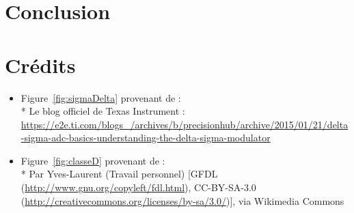 \documentclass[10pt, oneside, a4paper]{article}
\begin{document}
\section*{Conclusion}


\section*{Crédits}
\begin{itemize}

\item Figure~\ref{fig:sigmaDelta} provenant de :\\*
Le blog officiel de Texas Instrument :
\url{https://e2e.ti.com/blogs_/archives/b/precisionhub/archive/2015/01/21/delta-sigma-adc-basics-understanding-the-delta-sigma-modulator}

\item Figure~\ref{fig:classeD} provenant de :\\*
Par Yves-Laurent (Travail personnel) [GFDL (\url{http://www.gnu.org/copyleft/fdl.html}),
CC-BY-SA-3.0 (\url{http://creativecommons.org/licenses/by-sa/3.0/})], via Wikimedia Commons

\end{itemize}




\appendix



\end{document}
